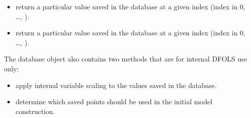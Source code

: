\documentclass[letterpaper,10pt,english]{sphinxmanual}
\begin{document}
\begin{itemize}
\item {} 
\sphinxAtStartPar
{} \sphinxhyphen{} return a particular  value saved in the database at a given index (index in 0, …, ).

\item {} 
\sphinxAtStartPar
{} \sphinxhyphen{} return a particular  value saved in the database at a given index (index in 0, …, ).

\end{itemize}

\sphinxAtStartPar
The database object also contains two methods that are for internal DFO\sphinxhyphen{}LS use only:
\begin{itemize}
\item {} 
\sphinxAtStartPar
{} \sphinxhyphen{} apply internal variable scaling to the  values saved in the database.

\item {} 
\sphinxAtStartPar
{} \sphinxhyphen{} determine which saved points should be used in the initial model construction.

\end{itemize}
\end{document}

